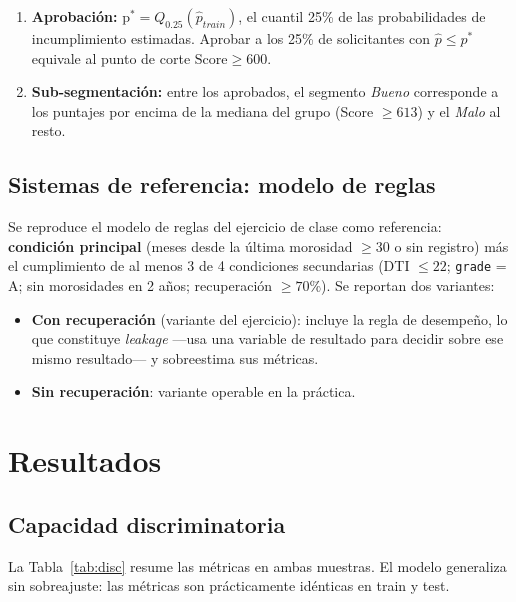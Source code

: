 \documentclass[11pt,letterpaper]{article}
\begin{document}
\begin{enumerate}
  \item \textbf{Aprobación:} $\text{p}^* = Q_{0.25}(\hat{p}_{train})$,
        el cuantil 25\% de las probabilidades de incumplimiento estimadas.
        Aprobar a los 25\% de solicitantes con $\hat{p} \leq p^*$ equivale al
        punto de corte $\text{Score} \geq 600$.
  \item \textbf{Sub-segmentación:} entre los aprobados, el segmento
        \emph{Bueno} corresponde a los puntajes por encima de la mediana del
        grupo (Score $\geq 613$) y el \emph{Malo} al resto.
\end{enumerate}

\subsection{Sistemas de referencia: modelo de reglas}

Se reproduce el modelo de reglas del ejercicio de clase como referencia:
\textbf{condición principal} (meses desde la última morosidad $\geq 30$ o sin
registro) más el cumplimiento de al menos 3 de 4 condiciones secundarias
(DTI $\leq 22$; \texttt{grade} = A; sin morosidades en 2 años; recuperación
$\geq 70\%$). Se reportan dos variantes:

\begin{itemize}
  \item \textbf{Con recuperación} (variante del ejercicio): incluye la regla
        de desempeño, lo que constituye \emph{leakage} —usa una variable de
        resultado para decidir sobre ese mismo resultado— y sobreestima sus
        métricas.
  \item \textbf{Sin recuperación}: variante operable en la práctica.
\end{itemize}

\section{Resultados}

\subsection{Capacidad discriminatoria}

La Tabla~\ref{tab:disc} resume las métricas en ambas muestras. El modelo
generaliza sin sobreajuste: las métricas son prácticamente idénticas en train
y test.
\end{document}
